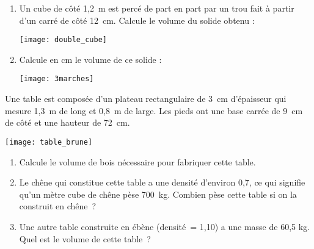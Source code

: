 \begin{exercice}
\begin{enumerate}
 \item Un cube de côté 1,2 m est percé de part en part par un trou fait à partir d'un carré de côté 12 cm. Calcule le volume du solide obtenu : \\[0.3em]
 \begin{center} \texttt{[image: double\_cube]} \end{center}
 \item Calcule en cm le volume de ce solide : \\[0.3em]
 \begin{center} \texttt{[image: 3marches]} \end{center}
 \end{enumerate}
\end{exercice}


\begin{exercice}
Une table est composée d'un plateau rectangulaire de 3 cm d'épaisseur qui mesure 1,3 m de long et 0,8 m de large. Les pieds ont une base carrée de 9 cm de côté et une hauteur de 72 cm. \\[0.3em]
 \begin{center} \texttt{[image: table\_brune]} \end{center}
 \begin{enumerate}
  \item Calcule le volume de bois nécessaire pour fabriquer cette table.
  \item Le chêne qui constitue cette table a une densité d'environ 0,7, ce qui signifie qu'un mètre cube de chêne pèse 700 kg. Combien pèse cette table si on la construit en chêne ?
  \item Une autre table construite en ébène (densité = 1,10) a une masse de 60,5 kg. Quel est le volume de cette table ?
  \end{enumerate}
\end{exercice}

